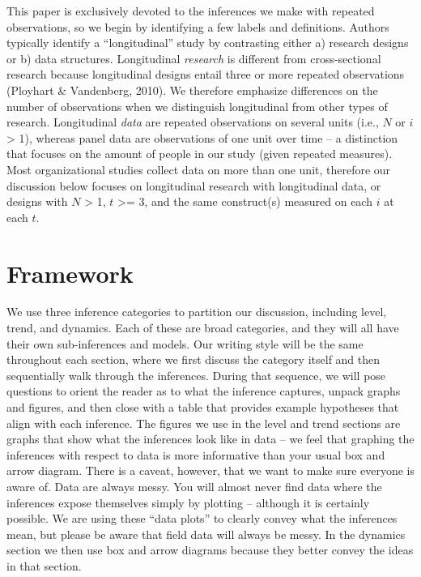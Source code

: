 \documentclass[english,,man]{apa6}
\theoremstyle{definition}
\theoremstyle{definition}
\theoremstyle{definition}
\theoremstyle{remark}
\begin{document}
This paper is exclusively devoted to the inferences we make with
repeated observations, so we begin by identifying a few labels and
definitions. Authors typically identify a \enquote{longitudinal} study
by contrasting either a) research designs or b) data structures.
Longitudinal \emph{research} is different from cross-sectional research
because longitudinal designs entail three or more repeated observations
(Ployhart \& Vandenberg, 2010). We therefore emphasize differences on
the number of observations when we distinguish longitudinal from other
types of research. Longitudinal \emph{data} are repeated observations on
several units (i.e., \(N\) or \(i\) \textgreater{} 1), whereas panel
data are observations of one unit over time -- a distinction that
focuses on the amount of people in our study (given repeated measures).
Most organizational studies collect data on more than one unit,
therefore our discussion below focuses on longitudinal research with
longitudinal data, or designs with \(N\) \textgreater{} 1, \(t\)
\textgreater{}= 3, and the same construct(s) measured on each \(i\) at
each \(t\).

\hypertarget{framework}{%
\section{Framework}\label{framework}}

We use three inference categories to partition our discussion, including
level, trend, and dynamics. Each of these are broad categories, and they
will all have their own sub-inferences and models. Our writing style
will be the same throughout each section, where we first discuss the
category itself and then sequentially walk through the inferences.
During that sequence, we will pose questions to orient the reader as to
what the inference captures, unpack graphs and figures, and then close
with a table that provides example hypotheses that align with each
inference. The figures we use in the level and trend sections are graphs
that show what the inferences look like in data -- we feel that graphing
the inferences with respect to data is more informative than your usual
box and arrow diagram. There is a caveat, however, that we want to make
sure everyone is aware of. Data are always messy. You will almost never
find data where the inferences expose themselves simply by plotting --
although it is certainly possible. We are using these \enquote{data
plots} to clearly convey what the inferences mean, but please be aware
that field data will always be messy. In the dynamics section we then
use box and arrow diagrams because they better convey the ideas in that
section.
\end{document}
